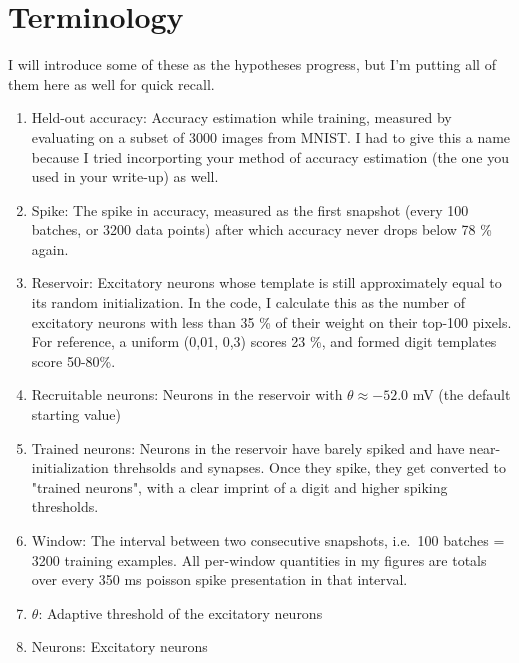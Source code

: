 \documentclass{article}
\begin{document}
\section{Terminology}
I will introduce some of these as the hypotheses progress, but I'm putting all of them here as well for quick recall.
\begin{enumerate}
    \item Held-out accuracy: Accuracy estimation while training, measured by evaluating on a subset of 3000 images from MNIST. I had to give this a name because I tried incorporting your method of accuracy estimation (the one you used in your write-up) as well.
    \item Spike: The spike in accuracy, measured as the first snapshot (every 100 batches, or 3200 data points) after which accuracy never drops below 78 \% again.
    \item Reservoir: Excitatory neurons whose template is still approximately equal to its random initialization. In the code, I calculate this as the number of excitatory neurons with less than 35 \% of their weight on their top-100 pixels. For reference, a uniform (0,01, 0,3) scores 23 \%, and formed digit templates score 50-80\%.
    \item Recruitable neurons: Neurons in the reservoir with $\theta \approx -52.0$ mV (the default starting value)
    \item Trained neurons: Neurons in the reservoir have barely spiked and have near-initialization threhsolds and synapses. Once they spike, they get converted to "trained neurons", with a clear imprint of a digit and higher spiking thresholds.
    \item Window: The interval between two consecutive snapshots, i.e.\ 100 batches = 3200 training examples.  All per-window quantities in my figures are totals over every 350 ms poisson spike presentation in that interval.
    \item $\theta$: Adaptive threshold of the excitatory neurons
    \item Neurons: Excitatory neurons
\end{enumerate}
\end{document}
